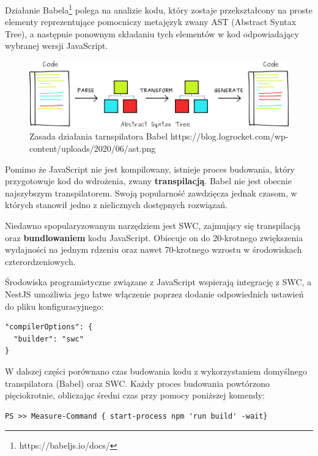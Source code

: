 \documentclass{article}
\begin{document}
Działanie Babela\footnote{https://babeljs.io/docs/} polega na analizie kodu, który zostaje przekształcony na proste elementy reprezentujące pomocniczy metajęzyk zwany AST (Abstract Syntax Tree), a następnie ponownym składaniu tych elementów w kod odpowiadający wybranej wersji JavaScript.


\begin{figure}[H]
    \centering
    \includegraphics[width=\textwidth]{ast.png}
    \caption{Zasada działania tarnspilatora Babel https://blog.logrocket.com/wp-content/uploads/2020/06/ast.png}
    \label{fig:ast}
\end{figure}

Pomimo że JavaScript nie jest kompilowany, istnieje proces budowania, który przygotowuje kod do wdrożenia, zwany \textbf{transpilacją}. Babel nie jest obecnie najszybszym transpilatorem\cite{BabelDailyDev}. Swoją popularność zawdzięcza jednak czasom, w których stanowił jedno z nielicznych dostępnych rozwiązań.

Niedawno spopularyzowanym narzędziem jest SWC, zajmujący się transpilacją oraz \textbf{bundlowaniem} kodu JavaScript. Obiecuje on do 20-krotnego zwiększenia wydajności na jednym rdzeniu oraz nawet 70-krotnego wzrostu w środowiskach czterordzeniowych\cite{BabelLogRocket}.

Środowiska programistyczne związane z JavaScript wspierają integrację z SWC, a NestJS umożliwia jego łatwe włączenie poprzez dodanie odpowiednich ustawień do pliku konfiguracyjnego:

\begin{lstlisting}[caption=Fragment pliku konfiguracyjnego nest-cli.json]
"compilerOptions": {
  "builder": "swc"
}
\end{lstlisting}

W dalszej części porównano czas budowania kodu z wykorzystaniem domyślnego transpilatora (Babel) oraz SWC. Każdy proces budowania powtórzono pięciokrotnie, obliczając średni czas przy pomocy poniższej komendy:

\begin{lstlisting}[caption=Komenda mierząca czas wykonania komendy w systemie Windows]
PS >> Measure-Command { start-process npm 'run build' -wait}
\end{lstlisting}
\end{document}
